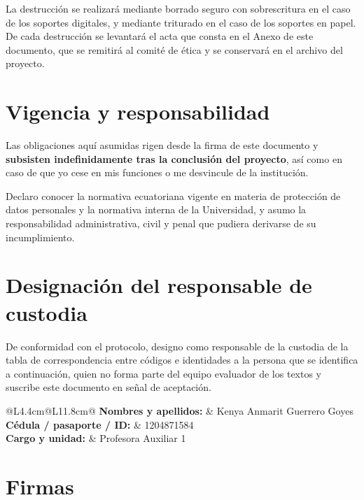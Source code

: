\documentclass[10.5pt,a4paper]{article}
\begin{document}
La destrucci\'on se realizar\'a mediante borrado seguro con sobrescritura en el caso de los soportes digitales, y mediante triturado en el caso de los soportes en papel. De cada destrucci\'on se levantar\'a el acta que consta en el Anexo de este documento, que se remitir\'a al comit\'e de \'etica y se conservar\'a en el archivo del proyecto.

\section{Vigencia y responsabilidad}

Las obligaciones aqu\'i asumidas rigen desde la firma de este documento y \textbf{subsisten indefinidamente tras la conclusi\'on del proyecto}, as\'i como en caso de que yo cese en mis funciones o me desvincule de la instituci\'on.

Declaro conocer la normativa ecuatoriana vigente en materia de protecci\'on de datos personales y la normativa interna de la Universidad, y asumo la responsabilidad administrativa, civil y penal que pudiera derivarse de su incumplimiento.

\section{Designaci\'on del responsable de custodia}

De conformidad con el protocolo, designo como responsable de la custodia de la tabla de correspondencia entre c\'odigos e identidades a la persona que se identifica a continuaci\'on, quien no forma parte del equipo evaluador de los textos y suscribe este documento en se\~nal de aceptaci\'on.

\vspace{2pt}
\begin{tabular}{@{}L{4.4cm}@{}L{11.8cm}@{}}
	\textbf{\small Nombres y apellidos:} & Kenya Anmarit Guerrero Goyes \\
	\textbf{\small C\'edula / pasaporte / ID:} & 1204871584 \\
	\textbf{\small Cargo y unidad:} & Profesora Auxiliar 1\\
\end{tabular}

\section{Firmas}
\end{document}
